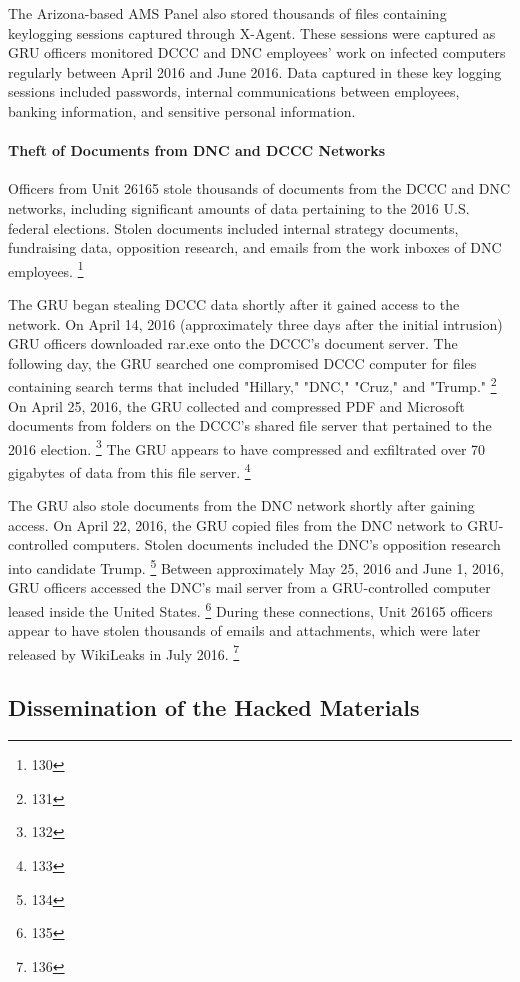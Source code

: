 The Arizona-based AMS Panel also stored thousands of files containing keylogging sessions captured through X-Agent.
These sessions were captured as GRU officers monitored DCCC and DNC employees' work on infected computers regularly between April 2016 and June 2016.
Data captured in these key logging sessions included passwords, internal communications between employees, banking information, and sensitive personal information.

\paragraph{Theft of Documents from DNC and DCCC Networks}

Officers from Unit 26165 stole thousands of documents from the DCCC and DNC networks, including significant amounts of data pertaining to the 2016 U.S. federal elections.
Stolen documents included internal strategy documents, fundraising data, opposition research, and emails from the work inboxes of DNC employees.%
\footnote{130}

The GRU began stealing DCCC data shortly after it gained access to the network.
On April 14, 2016 (approximately three days after the initial intrusion) GRU officers downloaded rar.exe onto the DCCC's document server.
The following day, the GRU searched one compromised DCCC computer for files containing search terms that included "Hillary," "DNC," "Cruz," and "Trump."%
\footnote{131}
On April 25, 2016, the GRU collected and compressed PDF and Microsoft documents from folders on the DCCC's shared file server that pertained to the 2016 election.%
\footnote{132}
The GRU appears to have compressed and exfiltrated over 70 gigabytes of data from this file server.%
\footnote{133}

The GRU also stole documents from the DNC network shortly after gaining access.
On April 22, 2016, the GRU copied files from the DNC network to GRU-controlled computers.
Stolen documents included the DNC's opposition research into candidate Trump.%
\footnote{134}
Between approximately May 25, 2016 and June 1, 2016, GRU officers accessed the DNC's mail server from a  GRU-controlled computer leased inside the United States.%
\footnote{135}
During these connections, Unit 26165 officers appear to have stolen thousands of emails and attachments, which were later released by WikiLeaks in July 2016.%
\footnote{136}

\subsection{Dissemination of the Hacked Materials}


